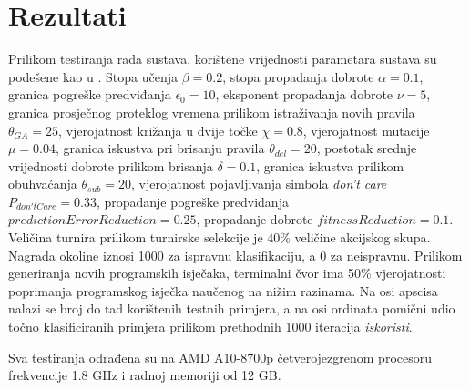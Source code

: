 \documentclass[times, utf8, zavrsni]{fer}
\begin{document}
\chapter{Rezultati} \label{ch:res}
Prilikom testiranja rada sustava, korištene vrijednosti parametara sustava su podešene kao u \citep{4}.
Stopa učenja $\beta = 0.2$, stopa propadanja dobrote $\alpha = 0.1$, granica pogreške predviđanja $\epsilon_{0} = 10$, eksponent propadanja dobrote $\nu = 5$, granica prosječnog proteklog vremena prilikom istraživanja novih pravila $\theta_{GA} = 25$, vjerojatnost križanja u dvije točke $\chi = 0.8$, vjerojatnost mutacije $\mu = 0.04$, granica iskustva pri brisanju pravila $\theta_{del} = 20$, postotak srednje vrijednosti dobrote prilikom brisanja $\delta = 0.1$, granica iskustva prilikom obuhvaćanja $\theta_{sub} = 20$, vjerojatnost pojavljivanja simbola \emph{don't care} $P_{don'tCare} = 0.33$, propadanje pogreške predviđanja $predictionErrorReduction = 0.25$, propadanje dobrote $fitnessReduction = 0.1$.
Veličina turnira prilikom turnirske selekcije je $40\%$ veličine akcijskog skupa.
Nagrada okoline iznosi 1000 za ispravnu klasifikaciju, a 0 za neispravnu.
Prilikom generiranja novih programskih isječaka, terminalni čvor ima 50\% vjerojatnosti poprimanja programskog isječka naučenog na nižim razinama.
Na osi apscisa nalazi se broj do tad korištenih testnih primjera, a na osi ordinata pomični udio točno klasificiranih primjera prilikom prethodnih 1000 iteracija \emph{iskoristi}.

Sva testiranja odrađena su na AMD A10-8700p četverojezgrenom procesoru frekvencije 1.8 GHz i radnoj memoriji od 12 GB.
\end{document}
